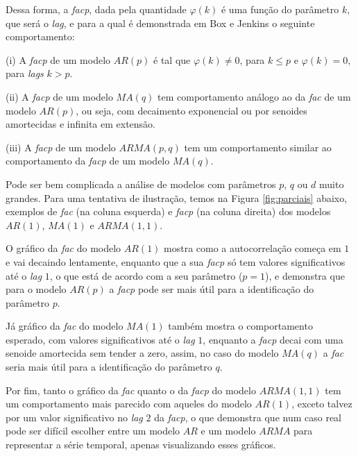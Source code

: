 Dessa forma, a \emph{facp}, dada pela quantidade $\varphi(k)$ é uma função do parâmetro $k$, que será o \emph{lag}, e para a qual é demonstrada em Box e Jenkins \citep{box} o seguinte comportamento:

(i) A \emph{facp} de um modelo $AR(p)$ é tal que $\varphi(k) \neq 0$, para $k \leq p$ e $\varphi(k) = 0$, para \emph{lags} $k > p$.

(ii) A \emph{facp} de um modelo $MA(q)$ tem comportamento análogo ao da \emph{fac} de um modelo $AR(p)$, ou seja, com decaimento exponencial ou por senoides amortecidas e infinita em extensão.

(iii) A \emph{facp} de um modelo $ARMA(p, q)$ tem um comportamento similar ao comportamento da \emph{facp} de um modelo $MA(q)$.

Pode ser bem complicada a análise de modelos com parâmetros $p$, $q$ ou $d$ muito grandes. Para uma tentativa de ilustração, temos na Figura \ref{fig:parciais} abaixo, exemplos de \emph{fac} (na coluna esquerda) e \emph{facp} (na coluna direita) dos modelos $AR(1)$, $MA(1)$ e $ARMA(1, 1)$.

O gráfico da \emph{fac} do modelo $AR(1)$ mostra como a autocorrelação começa em $1$ e vai decaindo lentamente, enquanto que a sua \emph{facp} só tem valores significativos até o \emph{lag} $1$, o que está de acordo com a seu parâmetro ($p=1$), e demonstra que para o modelo $AR(p)$ a \emph{facp} pode ser mais útil para a identificação do parâmetro $p$.

Já gráfico da \emph{fac} do modelo $MA(1)$ também mostra o comportamento esperado, com valores significativos até o \emph{lag} $1$, enquanto a \emph{facp} decai com uma senoide amortecida sem tender a zero, assim, no caso do modelo $MA(q)$ a \emph{fac} seria mais útil para a identificação do parâmetro $q$.

Por fim, tanto o gráfico da \emph{fac} quanto o da \emph{facp} do modelo  $ARMA(1, 1)$ tem um comportamento mais parecido com aqueles do modelo $AR(1)$, exceto talvez por um valor significativo no \emph{lag} $2$ da \emph{facp}, o que demonstra que num caso real pode ser difícil escolher entre um modelo $AR$ e um modelo $ARMA$ para representar a série temporal, apenas visualizando esses gráficos.

